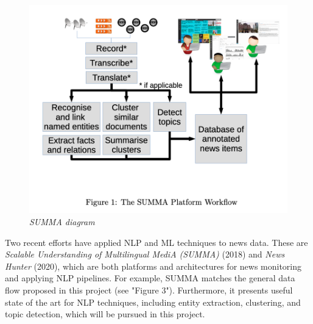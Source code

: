 \documentclass[11pt]{article}
\begin{document}
\begin{figure}
  \centerline{\includegraphics[scale=0.4]{literature-review--summa.png}}
  \caption{\textit{SUMMA diagram}}
\end{figure}

Two recent efforts have applied NLP and ML techniques to news data. These are \textit{Scalable Understanding of Multilingual MediA (SUMMA)} \cite{germann2018integrating} (2018) and \textit{News Hunter} \cite{berven2020knowledge} (2020), which are both platforms and architectures for news monitoring and applying NLP pipelines. For example, SUMMA matches the general data flow proposed in this project (see "Figure 3"). Furthermore, it presents useful state of the art for NLP techniques, including entity extraction, clustering, and topic detection, which will be pursued in this project.
\end{document}
